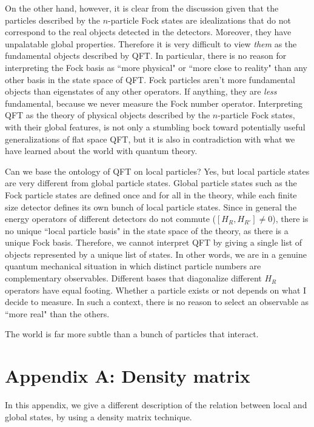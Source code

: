 \documentclass[11pt, nofootinbib]{revtex4-2}
\begin{document}
On the other hand, however, it is clear from the discussion given that
the particles described by the $n$-particle Fock states are
idealizations that do not correspond to the real objects detected in
the detectors.  Moreover, they have unpalatable global properties. 
Therefore it is very difficult to view \emph{them} as the fundamental
objects described by QFT. In particular, there is no reason for
interpreting the Fock basis as ``more physical" or ``more close to
reality" than any other basis in the state space of QFT. Fock
particles aren't more fundamental objects than eigenstates of any
other operators.  If anything, they are \emph{less} fundamental,
because we never measure the Fock number operator.  Interpreting QFT
as the theory of physical objects described by the $n$-particle Fock
states, with their global features, is not only a stumbling bock
toward potentially useful generalizations of flat space QFT, but it
is also in contradiction with what we have learned about the world
with quantum theory.

Can we base the ontology of QFT on local particles?  Yes, but local
particle states are very different from global particle states. 
Global particle states such as the Fock particle states are defined
once and for all in the theory, while each finite size detector
defines its own bunch of local particle states.  Since in general the
energy operators of different detectors do not commute
($[H_{R},H_{R'}]\ne 0$), there is no unique ``local particle basis" in
the state space of the theory, as there is a unique Fock basis. 
Therefore, we cannot interpret QFT by giving a single list of objects
represented by a unique list of states.  In other words, we are in a
genuine quantum mechanical situation in which distinct particle
numbers are complementary observables.  Different bases that
diagonalize different $H_{R}$ operators have equal footing.  Whether a
particle exists or not depends on what I decide to measure.  In such a
context, there is no reason to select an observable as ``more real"
than the others.

The world is far more subtle than a bunch of particles that interact.


\vskip2cm

\appendix

\section*{Appendix A: Density matrix}

In this appendix, we give a different description of the relation
between local and global states, by using a density matrix technique. 
\end{document}
